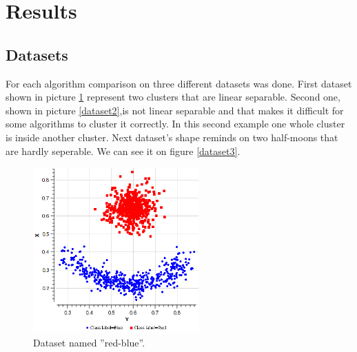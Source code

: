 \documentclass[conference]{IEEEtran}
\begin{document}

\section{Results}

\subsection{Datasets}

For each algorithm comparison on three different datasets was done. First dataset shown in picture \ref{dataset1}
represent two clusters that are linear separable. Second one, shown in picture \ref{dataset2},is not linear separable
and that makes it difficult for some algorithms to cluster it correctly. In this second example one
whole cluster is inside another cluster. Next dataset's shape reminds on two half-moons that are hardly seperable.
We can see it on figure \ref{dataset3}.

\begin{figure}[th]
\centering
\includegraphics[width=15pc]{red-blue.png}
\caption{Dataset named ''red-blue''.}
\label{dataset1}
\end{figure}
\end{document}

